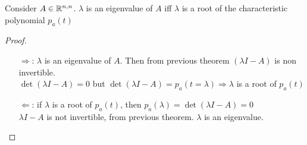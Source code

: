 \begin{theorem}
Consider $A\in\mathbb{R}^{n,n}$. $\lambda$ is an eigenvalue of $A$ iff $\lambda$ is a root of the characteristic polynomial $p_a(t)$
\end{theorem}
\begin{proof}
\begin{enumerate}
\item[$\Rightarrow$:] $\lambda$ is an eigenvalue of $A$. Then from previous theorem $(\lambda I -A) $ is non invertible. \\ $\det(\lambda I - A) = 0$ but $ \det(\lambda I - A) = p_a(t=\lambda)\Rightarrow\lambda$ is a root of $p_a(t)$
\item[$\Leftarrow$:] if $\lambda$ is a root of $p_a(t)$, then $p_a(\lambda ) = \det(\lambda I - A) = 0$\\ $\lambda I - A$ is not invertible, from previous theorem. $\lambda$ is an eigenvalue.
\end{enumerate}
\end{proof}
